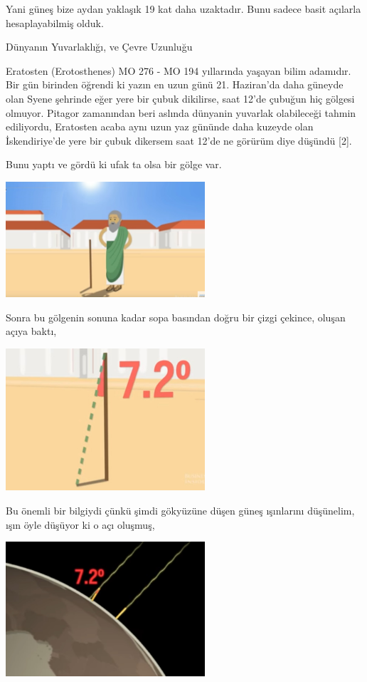 \documentclass[12pt,fleqn]{article}\usepackage{../../common}
\begin{document}
Yani güneş bize aydan yaklaşık 19 kat daha uzaktadır. Bunu sadece basit açılarla
hesaplayabilmiş olduk.

Dünyanın Yuvarlaklığı, ve Çevre Uzunluğu

Eratosten (Erotosthenes) MO 276 - MO 194 yıllarında yaşayan bilim adamıdır. Bir
gün birinden öğrendi ki yazın en uzun günü 21. Haziran'da daha güneyde olan
Syene şehrinde eğer yere bir çubuk dikilirse, saat 12'de çubuğun hiç gölgesi
olmuyor. Pitagor zamanından beri aslında dünyanin yuvarlak olabileceği
tahmin ediliyordu, Eratosten acaba aynı uzun yaz gününde daha kuzeyde olan
İskendiriye'de yere bir çubuk dikersem saat 12'de ne görürüm diye düşündü [2].

Bunu yaptı ve gördü ki ufak ta olsa bir gölge var. 

\includegraphics[width=20em]{circum3.jpg}

Sonra bu gölgenin sonuna kadar sopa basından doğru bir çizgi çekince, oluşan
açıya baktı,

\includegraphics[width=20em]{circum4.jpg}

Bu önemli bir bilgiydi çünkü şimdi gökyüzüne düşen güneş ışınlarını düşünelim,
ışın öyle düşüyor ki o açı oluşmuş, 

\includegraphics[width=20em]{circum1.jpg}
\end{document}
